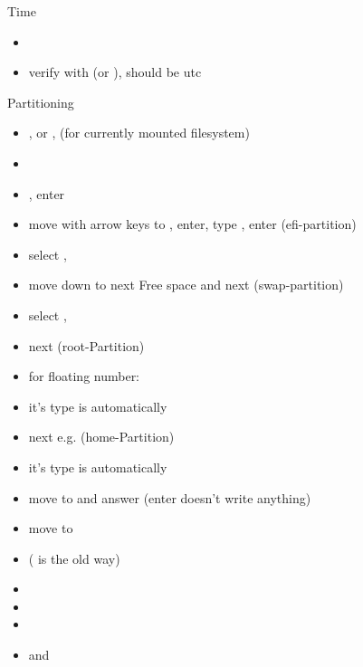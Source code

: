 \begin{frame}[fragile]{Time}
  \begin{itemize}
    \item {}
    \item verify with  (or ), should be utc
  \end{itemize}
\end{frame}

\begin{frame}{Partitioning\vspace{0.5cm}}
  \begin{itemize}
    \item {},  or ,  (for currently mounted filesystem)
    \item {}
    \item {}, enter
    \item move with arrow keys to , enter, type , enter (efi-partition)
    \item select , 
    \item move down to next Free space and next  (swap-partition)
    \item select , 
    \item next  (root-Partition)
    \item for floating number: 
    \item it's type is automatically 
    \item next e.g.  (home-Partition)
    \item it's type is automatically 
    \item move to  and answer  (enter doesn't write anything)
    \item move to 
    \item ( is the old way)
    \item {}
    \item {}
    \item {}
    \item {} and 
  \end{itemize}
\end{frame}

